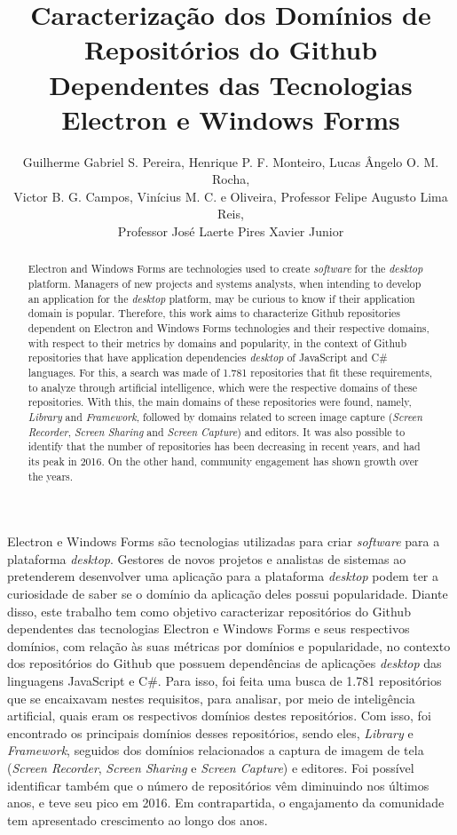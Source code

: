 \documentclass[12pt]{article}
\title{Caracterização dos Domínios de Repositórios do Github Dependentes das Tecnologias Electron e Windows Forms}
\author{Guilherme Gabriel S. Pereira, Henrique P. F. Monteiro, Lucas Ângelo O. M. Rocha, 
\\ Victor B. G. Campos, Vinícius M. C. e Oliveira, Professor Felipe Augusto Lima Reis, 
\\ Professor José Laerte Pires Xavier Junior }
\begin{document}
 

\maketitle 

\begin{abstract}

  Electron and Windows Forms are technologies used to create \textit{software} for the \textit{desktop} platform. Managers of new projects and systems analysts, when intending to develop an application for the \textit{desktop} platform, may be curious to know if their application domain is popular. Therefore, this work aims to characterize Github repositories dependent on Electron and Windows Forms technologies and their respective domains, with respect to their metrics by domains and popularity, in the context of Github repositories that have application dependencies \textit{desktop} of JavaScript and C\# languages. For this, a search was made of 1.781 repositories that fit these requirements, to analyze through artificial intelligence, which were the respective domains of these repositories. With this, the main domains of these repositories were found, namely, \textit{Library} and \textit{Framework}, followed by domains related to screen image capture (\textit{Screen Recorder}, \textit{Screen Sharing} and \textit{Screen Capture}) and editors. It was also possible to identify that the number of repositories has been decreasing in recent years, and had its peak in 2016. On the other hand, community engagement has shown growth over the years.

\end{abstract}
     
\begin{resumo} 

  Electron e Windows Forms são tecnologias utilizadas para criar \textit{software} para a plataforma \textit{desktop}. Gestores de novos projetos e analistas de sistemas ao pretenderem desenvolver uma aplicação para a plataforma \textit{desktop} podem ter a curiosidade de saber se o domínio da aplicação deles possui popularidade. Diante disso, este trabalho tem como objetivo caracterizar repositórios do Github dependentes das tecnologias Electron e Windows Forms e seus respectivos domínios, com relação às suas métricas por domínios e popularidade, no contexto dos repositórios do Github que possuem dependências de aplicações \textit{desktop} das linguagens JavaScript e C\#. Para isso, foi feita uma busca de 1.781 repositórios que se encaixavam nestes requisitos, para analisar, por meio de inteligência artificial, quais eram os respectivos domínios destes repositórios. Com isso, foi encontrado os principais domínios desses repositórios, sendo eles, \textit{Library} e \textit{Framework}, seguidos dos domínios relacionados a captura de imagem de tela (\textit{Screen Recorder}, \textit{Screen Sharing} e \textit{Screen Capture}) e editores. Foi possível identificar também que o número de repositórios vêm diminuindo nos últimos anos, e teve seu pico em 2016. Em contrapartida, o engajamento da comunidade tem apresentado crescimento ao longo dos anos.

\end{resumo}
\end{document}
